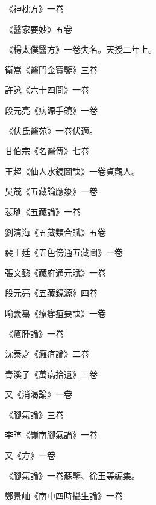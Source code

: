\begin{pinyinscope}
 《神枕方》一卷



 《醫家要妙》五卷



 《楊太僕醫方》一卷失名。天授二年上。



 衛嵩《醫門金寶鑒》三卷



 許詠《六十四問》一卷



 段元亮《病源手鏡》一卷



 《伏氏醫苑》一卷伏適。



 甘伯宗《名醫傳》七卷



 王超《仙人水鏡圖訣》一卷貞觀人。



 吳兢《五藏論應象》一卷



 裴璡《五藏論》一卷



 劉清海《五藏類合賦》五卷



 裴王廷《五色傍通五藏圖》一卷



 張文懿《藏府通元賦》一卷



 段元亮《五藏鏡源》四卷



 喻義纂《療癰疽要訣》一卷



 《瘡腫論》一卷



 沈泰之《癰疽論》二卷



 青溪子《萬病拾遺》三卷



 又《消渴論》一卷



 《腳氣論》三卷



 李暄《嶺南腳氣論》一卷



 又《方》一卷



 《腳氣論》一卷蘇鑒、徐玉等編集。



 鄭景岫《南中四時攝生論》一卷




\end{pinyinscope}
